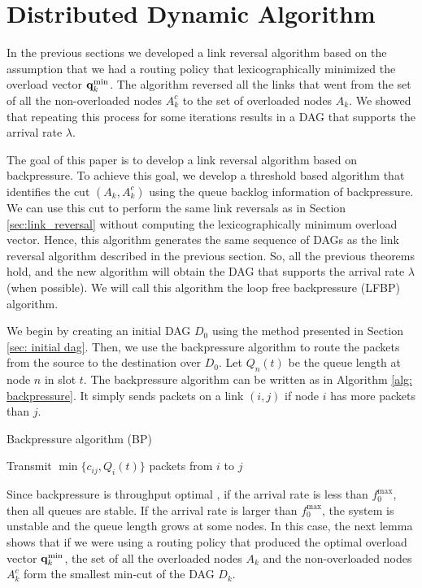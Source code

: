\documentclass{sig-alternate-2013}
\begin{document}
\section{Distributed Dynamic Algorithm} \label{dynamic algorithm}

In the previous sections we developed a link reversal algorithm based on the assumption that we had a routing policy that lexicographically minimized the overload vector ${\bf q}^{\min}_k$. The algorithm reversed all the links that went from the set of all the non-overloaded nodes $A_k^c$ to the set of overloaded nodes $A_k$. We showed that repeating this process for some iterations results in a DAG that supports the arrival rate $\lambda$. 

The goal of this paper is to develop a link reversal algorithm based on backpressure. To achieve this goal, we develop a threshold based algorithm that identifies the cut $(A_k, A_k^c)$ using the queue backlog information of backpressure. We can use this cut to perform the same link reversals as in Section \ref{sec:link_reversal} without computing the lexicographically minimum overload vector. Hence, this algorithm generates the same sequence of DAGs as the link reversal algorithm described in the previous section. So, all the previous theorems hold, and the new algorithm will obtain the DAG that supports the arrival rate $\lambda$ (when possible). We will call this algorithm the loop free backpressure (LFBP) algorithm.





We begin by creating an initial DAG $D_0$ using 
 the method presented in Section \ref{sec: initial dag}. Then, we use the backpressure algorithm to route the packets from the source to the destination over $D_0$.
 Let $Q_n(t)$ be the queue length  at node $n$ in slot $t$. The backpressure algorithm can be written as in Algorithm \ref{alg: backpressure}. It simply sends packets on a link $(i,j)$ if node $i$ has more packets than $j$.

\begin{algorithm} [h]
\caption{Backpressure algorithm (BP)}
\label{alg: backpressure}
\begin{algorithmic}[1]
		\State Transmit $\min\{c_{ij}, Q_i(t)\}$ packets from  $i$ to $j$
\EndIf
\EndFor
\end{algorithmic}
\end{algorithm}

Since backpressure is throughput optimal \cite{tassiulas}, if the arrival rate is less than  $ f_0^{\max}$, then all queues are stable.
If the arrival rate is larger than $ f_0^{\max}$, the system is unstable and the queue length  grows at some nodes. In this case, the next lemma shows that if we were using a routing policy that produced the optimal overload vector ${\bf q}^{\min}_k$, the set of all the overloaded nodes $A_k$ and the non-overloaded nodes $A_k^c$  form the smallest min-cut of the DAG $D_k$.
\end{document}
